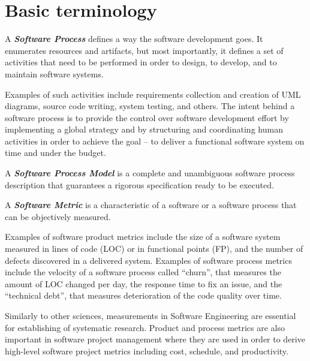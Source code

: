 \section{Basic terminology}\label{section_terminology}
\begin{defn}\label{def_process}
A \textbf{\textit{Software Process}} defines a way the software development goes. It enumerates
resources and artifacts, but most importantly, it defines a set of activities that need to be 
performed in order to design, to develop, and to maintain software systems.
\end{defn}
Examples of such activities include requirements collection and creation of UML diagrams, 
source code writing, system testing, and others. The intent behind a software process is to provide 
the control over software development effort by implementing a global strategy and by structuring
and coordinating human activities in order to achieve the goal -- to deliver a functional
software system on time and under the budget. 


\begin{defn}\label{def_process_model}
A \textbf{\textit{Software Process Model}} is a complete and unambiguous software process description 
that guarantees a rigorous specification ready to be executed.
\end{defn}

\begin{defn}\label{def_metric}
A \textbf{\textit{Software Metric}} is a characteristic of a software or a software process that can be 
objectively measured.
\end{defn}
Examples of software product metrics include the size of a software system measured in lines of code 
(LOC) or in functional points (FP), and the number of defects discovered in a delivered system. 
Examples of software process metrics include the velocity of a software process called ``churn'', that 
measures the amount of LOC changed per day, the response time to fix an issue, and the ``technical debt'', 
that measures deterioration of the code quality over time. 

Similarly to other sciences, measurements in Software Engineering are essential for establishing of systematic 
research. Product and process metrics are also important in software project management where they are 
used in order to derive high-level software project metrics including cost, schedule, and productivity.


